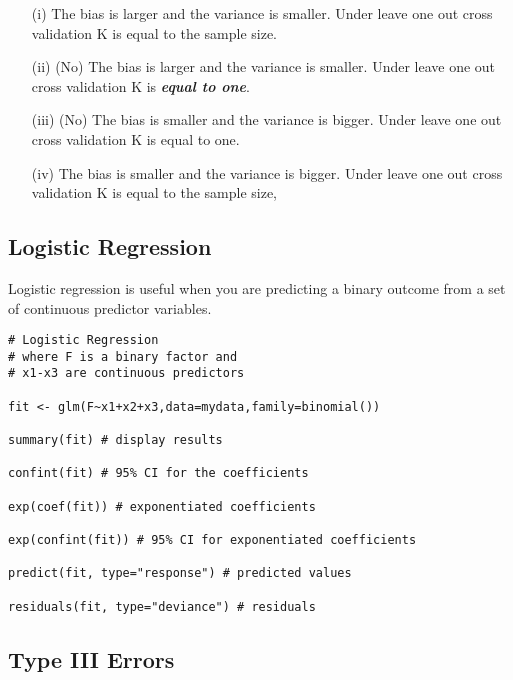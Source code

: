 \documentclass[12pt]{article}
\begin{document}
\begin{itemize}
\item[(i)]The bias is larger and the variance is smaller. Under leave one out cross validation K is equal to the sample size.			
\item[(ii)] (No) The bias is larger and the variance is smaller. Under leave one out cross validation K is \textbf{\textit{equal to one}}.			
\item[(iii)] (No) The bias is smaller and the variance is bigger. Under leave one out cross validation K is equal to one.
\item[(iv)] The bias is smaller and the variance is bigger. Under leave one out cross validation K is equal to the sample size,
\end{itemize}
\newpage

\subsection*{Logistic Regression}

Logistic regression is useful when you are predicting a binary outcome from a set of continuous predictor variables. 
\begin{framed}
\begin{verbatim}
# Logistic Regression
# where F is a binary factor and 
# x1-x3 are continuous predictors 

fit <- glm(F~x1+x2+x3,data=mydata,family=binomial())

summary(fit) # display results

confint(fit) # 95% CI for the coefficients

exp(coef(fit)) # exponentiated coefficients

exp(confint(fit)) # 95% CI for exponentiated coefficients

predict(fit, type="response") # predicted values

residuals(fit, type="deviance") # residuals

\end{verbatim}
\end{framed}
\newpage
\subsection*{Type III Errors}
\end{document}
